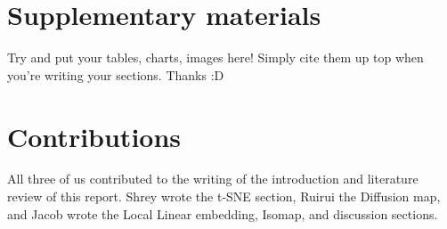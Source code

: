 \documentclass[12pt]{article}
\begin{document}
\section{Supplementary materials}

Try and put your tables, charts, images here! Simply cite them up top when you're writing your sections. Thanks :D

\section{Contributions}

\hspace{5mm}All three of us contributed to the writing of the introduction and literature review of this report. Shrey wrote the t-SNE section, Ruirui the Diffusion map, and Jacob wrote the Local Linear embedding, Isomap, and discussion sections. 
\end{document}
